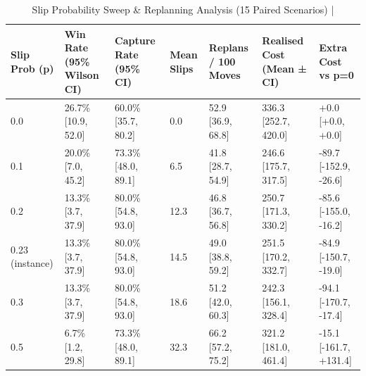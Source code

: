 \begin{table}[htbp]
\centering
\caption{Slip Probability Sweep & Replanning Analysis (15 Paired Scenarios) | \stampline}
\label{tab:partC_slip}
\begin{tabular}{lllllll}
\toprule
Slip Prob (p) & Win Rate (95\% Wilson CI) & Capture Rate (95\% CI) & Mean Slips & Replans / 100 Moves & Realised Cost (Mean ± CI) & Extra Cost vs p=0 \\
\midrule
0.0 & 26.7\% [10.9, 52.0] & 60.0\% [35.7, 80.2] & 0.0 & 52.9 [36.9, 68.8] & 336.3 [252.7, 420.0] & +0.0 [+0.0, +0.0] \\
0.1 & 20.0\% [7.0, 45.2] & 73.3\% [48.0, 89.1] & 6.5 & 41.8 [28.7, 54.9] & 246.6 [175.7, 317.5] & -89.7 [-152.9, -26.6] \\
0.2 & 13.3\% [3.7, 37.9] & 80.0\% [54.8, 93.0] & 12.3 & 46.8 [36.7, 56.8] & 250.7 [171.3, 330.2] & -85.6 [-155.0, -16.2] \\
0.23 (instance) & 13.3\% [3.7, 37.9] & 80.0\% [54.8, 93.0] & 14.5 & 49.0 [38.8, 59.2] & 251.5 [170.2, 332.7] & -84.9 [-150.7, -19.0] \\
0.3 & 13.3\% [3.7, 37.9] & 80.0\% [54.8, 93.0] & 18.6 & 51.2 [42.0, 60.3] & 242.3 [156.1, 328.4] & -94.1 [-170.7, -17.4] \\
0.5 & 6.7\% [1.2, 29.8] & 73.3\% [48.0, 89.1] & 32.3 & 66.2 [57.2, 75.2] & 321.2 [181.0, 461.4] & -15.1 [-161.7, +131.4] \\
\bottomrule
\end{tabular}

\end{table}
